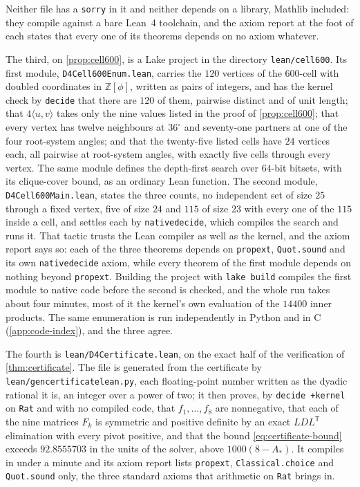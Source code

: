 \documentclass[11pt,reqno]{amsart}
\renewcommand{\_}{\origunderscore\allowbreak}
\numberwithin{equation}{section}
\theoremstyle{plain}
\theoremstyle{definition}
\theoremstyle{remark}
\begin{document}
Neither file has a \texttt{sorry} in it and neither depends on a
library, Mathlib included: they compile against a bare Lean~4 toolchain,
and the axiom report at the foot of each states that every one of its
theorems depends on no axiom whatever.

The third, on \cref{prop:cell600}, is a Lake project in the
directory \texttt{lean/cell600}. Its first module,
\texttt{D4Cell600Enum.lean}, carries the $120$ vertices of the $600$-cell with doubled coordinates
in $\mathbb{Z}[\phi]$, written as pairs of integers, and has the kernel
check by \texttt{decide} that there are $120$ of them, pairwise
distinct and of unit length; that $4\langle u,v\rangle$ takes only the
nine values listed in the proof of \cref{prop:cell600}; that every
vertex has twelve neighbours at $36^\circ$ and seventy-one partners at
one of the four root-system angles; and that the twenty-five listed
cells have $24$ vertices each, all pairwise at root-system angles, with
exactly five cells through every vertex. The same module defines the
depth-first search over $64$-bit bitsets, with its clique-cover bound,
as an ordinary Lean function. The second module,
\texttt{D4Cell600Main.lean}, states the three counts, no independent
set of size $25$ through a fixed vertex, five of size $24$ and $115$ of
size $23$ with every one of the $115$ inside a cell, and settles each by
\texttt{native\_decide}, which compiles the search and runs it. That
tactic trusts the Lean compiler as well as the kernel, and the axiom
report says so: each of the three theorems depends on
\texttt{propext}, \texttt{Quot.sound} and its own
\texttt{native\_decide} axiom, while every theorem of the first module
depends on nothing beyond \texttt{propext}. Building the project with
\texttt{lake build} compiles the first module to native code before the
second is checked, and the whole run takes about four minutes, most of
it the kernel's own evaluation of the $14400$ inner products. The same
enumeration is run independently in Python and in C
(\cref{app:code-index}), and the three agree.

The fourth is \texttt{lean/D4Certificate.lean}, on the exact half of
the verification of \cref{thm:certificate}. The file is generated from
the certificate by \texttt{lean/gen\_certificate\_lean.py}, each
floating-point number written as the dyadic rational it is, an integer
over a power of two; it then proves, by \texttt{decide +kernel} on
\texttt{Rat} and with no compiled code, that $f_1,\dots,f_8$ are
nonnegative, that each of the nine matrices $F_k$ is symmetric and
positive definite by an exact $LDL^{\mathsf T}$ elimination with every
pivot positive, and that the bound \eqref{eq:certificate-bound} exceeds
$92.8555703$ in the units of the solver, above $1000(8-A_*)$. It
compiles in under a minute and its axiom report lists
\texttt{propext}, \texttt{Classical.choice} and \texttt{Quot.sound}
only, the three standard axioms that arithmetic on \texttt{Rat} brings
in.
\end{document}
